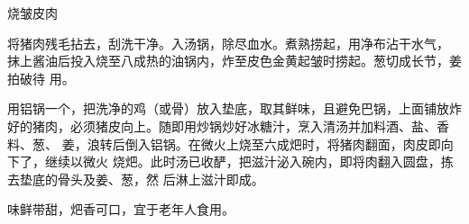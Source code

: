 %
%
%
%
%
%
%
\begin{recipe}{烧皱皮肉}

\ingredients


\preparation

\step 将猪肉残毛拈去，刮洗干净。入汤锅，除尽血水。煮熟捞起，用净布沾干水气，
抹上酱油后投入烧至八成热的油锅内，炸至皮色金黄起皱时捞起。葱切成长节，姜拍破待
用。

\step 用铝锅一个，把洗净的鸡（或骨）放入垫底，取其鲜味，且避免巴锅，上面铺放炸
好的猪肉，必须猪皮向上。随即用炒锅炒好冰糖汁，烹入清汤并加料酒、盐、香料、葱、
姜，浪转后倒入铝锅。在微火上烧至六成𤆵时，将猪肉翻面，肉皮即向下了，继续以微火
烧𤆵。此时汤已收酽，把滋汁泌入碗内，即将肉翻入圆盘，拣去垫底的骨头及姜、葱，然
后淋上滋汁即成。

\features

味鲜带甜，𤆵香可口，宜于老年人食用。

\end{recipe}

